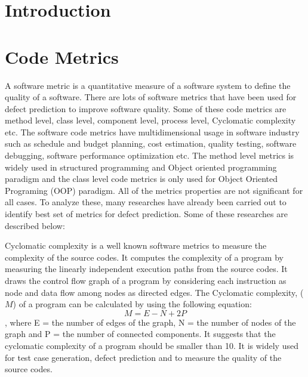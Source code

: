 \documentclass[12pt]{report}
\begin{document}
\section{Introduction}
\section{Code Metrics}
    
A software metric is a quantitative measure of a software system to define the quality of a software. There are lots of software metrics that have been used for defect prediction to improve software quality. Some of these code metrics are method level, class level, component level, process level, Cyclomatic complexity etc. The software code metrics have multidimensional usage in software industry such as schedule and budget planning, cost estimation, quality testing, software debugging, software performance optimization etc. The method level metrics is widely used in structured programming and Object oriented programming paradigm and the class level code metrics is only used for Object Oriented Programing (OOP) paradigm. All of the metrics properties are not significant for all cases. To analyze these, many researches have already been carried out to identify best set of metrics for defect prediction. Some of these researches are described below:
 
Cyclomatic complexity \cite{mccabe1976complexity} is a well known software metrics to measure the complexity of the source codes. It computes the complexity of a program by measuring the linearly independent execution paths from the source codes. It draws the control flow graph of a program by considering each instruction as node and data flow among nodes as directed edges. The Cyclomatic complexity, ($M$) of a program can be calculated by using the following equation:  
	\[M = E − N + 2P\], where
E = the number of edges of the graph,
N = the number of nodes of the graph and 
P = the number of connected components.
It suggests that the cyclomatic complexity of a program should be smaller than 10. It is widely used for test case generation, defect prediction and to measure the quality of the source codes. 
\end{document}
